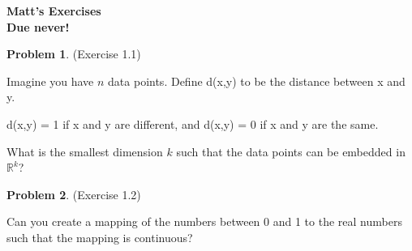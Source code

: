\documentclass[12pt,oneside]{article}
\theoremstyle{definition}
\newtheorem{problem}{Problem}
\begin{document}
\pagestyle{fancy}


\begin{center}
\bf \Large
Matt's Exercises \\[0.5 em]
\large
Due never!
\end{center}

\bigskip



\begin{problem}
(Exercise 1.1)

Imagine you have $n$ data points. Define d(x,y) to be the distance between x and y. 

d(x,y) = 1 if x and y are different, and d(x,y) = 0 if x and y are the same.

What is the smallest dimension $k$ such that the data points can be embedded in $\mathbb{R}^k$?


\end{problem}


\begin{problem}
(Exercise 1.2)

Can you create a mapping of the numbers between 0 and 1 to the real numbers such that the mapping is continuous?


\end{problem}   
\end{document}
